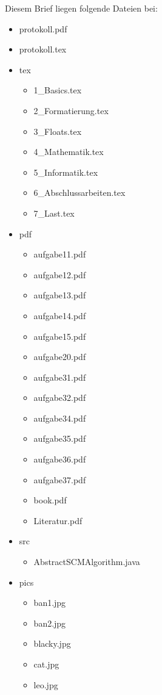 \documentclass[11pt,ngerman,latin9]{g-brief}
\begin{document}
\begin{g-brief}

Diesem Brief liegen folgende Dateien bei:
\begin{itemize}
 \item protokoll.pdf
 
 \item protokoll.tex
 
 \item tex
 \begin{itemize}
  \item 1\_Basics.tex
  \item 2\_Formatierung.tex
  \item 3\_Floats.tex
  \item 4\_Mathematik.tex
  \item 5\_Informatik.tex
  \item 6\_Abschlussarbeiten.tex
  \item 7\_Last.tex
 \end{itemize}
\pagebreak
 \item pdf
 \begin{itemize}
  \item aufgabe11.pdf
  \item aufgabe12.pdf
  \item aufgabe13.pdf
  \item aufgabe14.pdf
  \item aufgabe15.pdf
  \item aufgabe20.pdf
  \item aufgabe31.pdf
  \item aufgabe32.pdf
  \item aufgabe34.pdf
  \item aufgabe35.pdf
  \item aufgabe36.pdf
  \item aufgabe37.pdf
  \item book.pdf
  \item Literatur.pdf
 \end{itemize}

 \item src
 \begin{itemize}
  \item AbstractSCMAlgorithm.java
 \end{itemize}
 
 \item pics
 \begin{itemize}
  \item ban1.jpg
  \item ban2.jpg
  \item blacky.jpg
  \item cat.jpg
  \item leo.jpg
 \end{itemize}


\end{itemize}
\end{g-brief}
\end{document}
